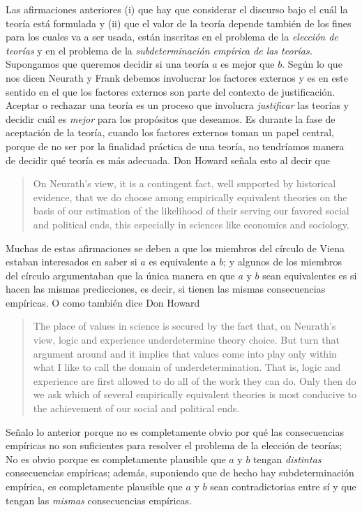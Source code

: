 Las afirmaciones anteriores (i) que hay que considerar el discurso bajo el cuál la teoría está formulada y (ii) que el valor de la teoría depende también de los fines para los cuales va a ser usada, están inscritas en el problema de la \emph{elección de teorías} y en el problema de la \emph{subdeterminación empírica de las teorías.}
Supongamos que queremos decidir si una teoría $a$ es mejor que $b$. 
Según lo que nos dicen Neurath y Frank debemos involucrar los factores externos y es en este sentido en el que los factores externos son parte del contexto de justificación.
Aceptar o rechazar una teoría es un proceso que involucra \emph{justificar} las teorías y decidir cuál es \emph{mejor} para los propósitos que deseamos.
Es durante la fase de aceptación de la teoría, cuando los factores externos toman un papel central, porque de no ser por la finalidad práctica de una teoría, no tendríamos manera de decidir qué teoría es más adecuada.
Don Howard señala esto al decir que 

\begin{quote}
	On Neurath’s view, it is a contingent fact, well supported by historical evidence, that we do choose among empirically equivalent theories on the basis of our estimation of the likelihood of their serving our favored social and political ends, this especially in sciences like economics and sociology. \parencite[p.~5]{Howard2006}
\end{quote}

Muchas de estas afirmaciones se deben a que los miembros del círculo de Viena estaban interesados en saber si $a$ es equivalente a $b$;
y algunos de los miembros del círculo argumentaban que la única manera en que $a$ y $b$ sean equivalentes es si hacen las mismas predicciones, es decir, si tienen las mismas consecuencias empíricas.
O como también dice Don Howard

\begin{quote}
	The place of values in science is secured by the fact that, on Neurath’s view, logic and experience underdetermine theory choice.
	But turn that argument around and it implies that values come into play only within what I like to call the domain of underdetermination. 
	That is, logic and experience are first allowed to do all of the work they can do. 
	Only then do we ask which of several empirically equivalent theories is most conducive to the achievement of our social and political ends. \parencite[p.~10]{Howard2006}
\end{quote}

Señalo lo anterior porque no es completamente obvio por qué las consecuencias empíricas no son suficientes para resolver el problema de la elección de teorías;
No es obvio porque es completamente plausible que $a$ y $b$ tengan \emph{distintas} consecuencias empíricas;
además, suponiendo que de hecho hay subdeterminación empírica, es completamente plausible que $a$ y $b$ sean contradictorias entre sí y que tengan las \emph{mismas} consecuencias empíricas.


